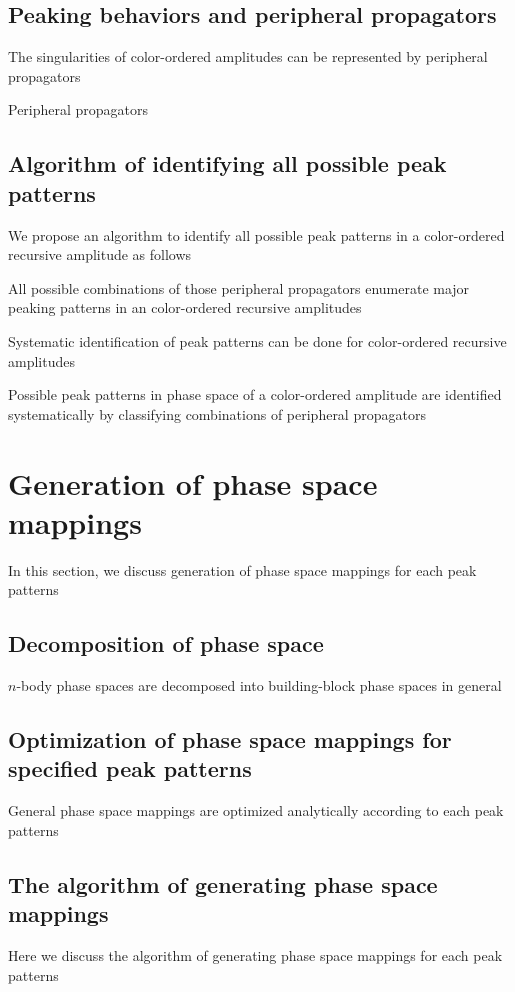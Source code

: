 \documentclass{book}
\begin{document}
\subsection{Peaking behaviors and peripheral propagators}
The singularities of color-ordered amplitudes can be represented by peripheral propagators

Peripheral propagators

\subsection{Algorithm of identifying all possible peak patterns}
We propose an algorithm to identify all possible peak patterns in a color-ordered recursive amplitude as follows

All possible combinations of those peripheral propagators enumerate major peaking patterns in an color-ordered recursive amplitudes

Systematic identification of peak patterns can be done for color-ordered recursive amplitudes

Possible peak patterns in phase space of a color-ordered amplitude are identified systematically by classifying combinations of peripheral propagators 

\section{Generation of phase space mappings }
In this section, we discuss generation of phase space mappings for each peak patterns

\subsection{Decomposition of phase space}
$n$-body phase spaces are decomposed into building-block phase spaces in general

\subsection{Optimization of phase space mappings for specified peak patterns}
General phase space mappings are optimized analytically according to each peak patterns 

\subsection{The algorithm of generating phase space mappings}
Here we discuss the algorithm of generating phase space mappings for each peak patterns
\end{document}
